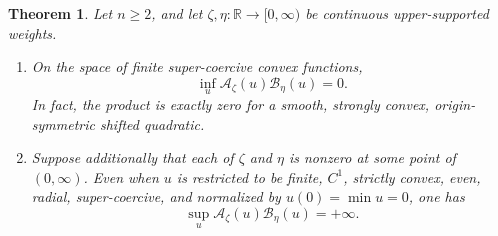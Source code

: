 \documentclass[11pt]{amsart}
\newtheorem{theorem}{Theorem}
\theoremstyle{remark}
\newcommand{\R}{\mathbb R}
\newcommand{\A}{\mathcal A}
\newcommand{\B}{\mathcal B}
\begin{document}
\begin{theorem}
\label{thm:obstruction}
Let $n\geq2$, and let $\zeta,\eta:\R\to[0,\infty)$ be continuous
upper-supported weights.
\begin{enumerate}[label=\textnormal{(\roman*)}]
\item On the space of finite super-coercive convex functions,
\[
       \inf_u \A_\zeta(u)\B_\eta(u)=0.
\]
In fact, the product is exactly zero for a smooth, strongly convex,
origin-symmetric shifted quadratic.
\item Suppose additionally that each of $\zeta$ and $\eta$ is nonzero at
some point of $(0,\infty)$.  Even when $u$ is restricted to be finite,
$C^1$, strictly convex, even, radial, super-coercive, and normalized by
$u(0)=\min u=0$, one has
\[
       \sup_u \A_\zeta(u)\B_\eta(u)=+\infty.
\]
\end{enumerate}
\end{theorem}
\end{document}
